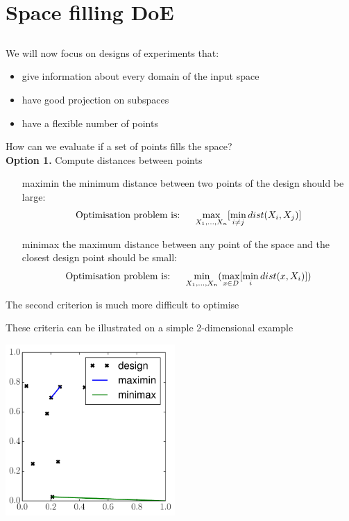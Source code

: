 \documentclass{beamer}
\begin{document}
\section{Space filling DoE}
\subsection{}


\begin{frame}{}
We will now focus on designs of experiments that:
\begin{itemize}
	\item give information about every domain of the input space
	\item have good projection on subspaces
	\item have a flexible number of points
\end{itemize}
\end{frame}

\begin{frame}{}
How can we evaluate if a set of points fills the space?\\ \vspace{5mm}
\textbf{Option 1.} Compute distances between points\\
\begin{itemize}
	\item[maximin] the minimum distance between two points of the design should be large:
	$$\text{Optimisation problem is: \quad} \max_{X_1,\dots,X_n} [ \min_{i \neq j} dist(X_i,X_j) ]$$
	\item[minimax] the maximum distance between any point of the space and the closest design point should be small:
	$$\text{Optimisation problem is: \quad} \min_{X_1,\dots,X_n} (\max_{x \in D} [ \min_i dist(x,X_i) ])$$
\end{itemize}
The second criterion is much more difficult to optimise
\end{frame}

\begin{frame}{}
These criteria can be illustrated on a simple 2-dimensional example
\begin{center}
\includegraphics[height=6.5cm]{figures/python/spf_minimaxmaximin}
\end{center}
\end{frame}
\end{document}

